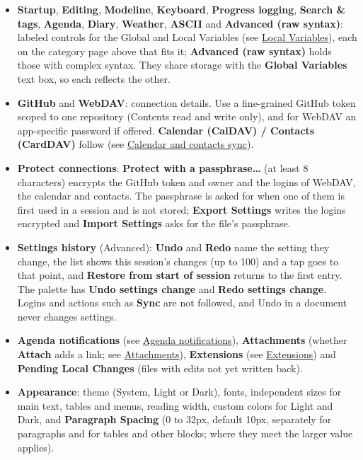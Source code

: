 \documentclass[11pt]{article}
\begin{document}
\begin{itemize}
\item \textbf{Startup}, \textbf{Editing}, \textbf{Modeline}, \textbf{Keyboard}, \textbf{Progress logging}, \textbf{Search \& tags}, \textbf{Agenda}, \textbf{Diary}, \textbf{Weather}, \textbf{ASCII} and \textbf{Advanced (raw syntax)}: labeled controls for the Global and Local Variables (see \hyperref[sec:org761a631]{Local Variables}), each on the category page above that fits it; \textbf{Advanced (raw syntax)} holds those with complex syntax. They share storage with the \textbf{Global Variables} text box, so each reflects the other.
\item \textbf{GitHub} and \textbf{WebDAV}: connection details. Use a fine-grained GitHub token scoped to one repository (Contents read and write only), and for WebDAV an app-specific password if offered. \textbf{Calendar (CalDAV) / Contacts (CardDAV)} follow (see \hyperref[sec:orge18f01c]{Calendar and contacts sync}).
\item \textbf{Protect connections}: \textbf{Protect with a passphrase…} (at least 8 characters) encrypts the GitHub token and owner and the logins of WebDAV, the calendar and contacts. The passphrase is asked for when one of them is first used in a session and is not stored; \textbf{Export Settings} writes the logins encrypted and \textbf{Import Settings} asks for the file's passphrase.
\item \textbf{Settings history} (Advanced): \textbf{Undo} and \textbf{Redo} name the setting they change, the list shows this session's changes (up to 100) and a tap goes to that point, and \textbf{Restore from start of session} returns to the first entry. The palette has \textbf{Undo settings change} and \textbf{Redo settings change}. Logins and actions such as \textbf{Sync} are not followed, and Undo in a document never changes settings.
\item \textbf{Agenda notifications} (see \hyperref[sec:org4c355fc]{Agenda notifications}), \textbf{Attachments} (whether \textbf{Attach} adds a link; see \hyperref[sec:org970e59b]{Attachments}), \textbf{Extensions} (see \hyperref[sec:orgd63a52b]{Extensions}) and \textbf{Pending Local Changes} (files with edits not yet written back).
\item \textbf{Appearance}: theme (System, Light or Dark), fonts, independent sizes for main text, tables and menus, reading width, custom colors for Light and Dark, and \textbf{Paragraph Spacing} (0 to 32px, default 10px, separately for paragraphs and for tables and other blocks; where they meet the larger value applies).

\end{itemize}
\end{document}
